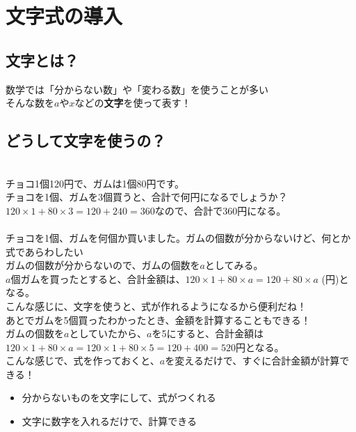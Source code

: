 \documentclass[11pt]{article}
\begin{document}
\section{文字式の導入}
\subsection*{文字とは？}
数学では「分からない数」や「変わる数」を使うことが多い\\
そんな数を$a$や$x$などの\textbf{文字}を使って表す！

\subsection*{どうして文字を使うの？}
\\
チョコ1個120円で、ガムは1個80円です。\\
チョコを1個、ガムを3個買うと、合計で何円になるでしょうか？\\
$120 \times 1 + 80 \times 3 = 120 + 240 =360$なので、合計で360円になる。\\

\\
チョコを1個、ガムを何個か買いました。ガムの個数が分からないけど、何とか式であらわしたい\\
ガムの個数が分からないので、ガムの個数を$a$としてみる。\\
$a$個ガムを買ったとすると、合計金額は、$120 \times 1 + 80 \times a =120 + 80 \times a$ (円)となる。\\
こんな感じに、文字を使うと、式が作れるようになるから便利だね！\\

あとでガムを5個買ったわかったとき、金額を計算することもできる！\\
ガムの個数を$a$としていたから、$a$を5にすると、合計金額は\\
$120 \times 1 + 80 \times a = 120 \times 1 + 80 \times 5 =120 + 400 = 520$円となる。\\
こんな感じで、式を作っておくと、$a$を変えるだけで、すぐに合計金額が計算できる！\\

\begin{tcolorbox}[mybox={文字のメリット}]
\begin{itemize}
\item 分からないものを文字にして、式がつくれる
\item 文字に数字を入れるだけで、計算できる
\end{itemize}
\end{tcolorbox}
\end{document}
